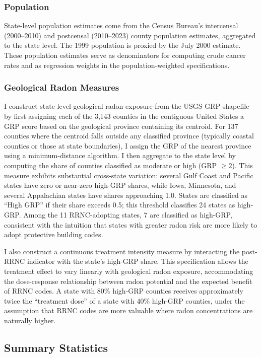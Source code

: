 \documentclass[12pt]{article}
\begin{document}
\subsubsection*{Population} State-level population estimates come from the Census Bureau's intercensal (2000--2010) and postcensal (2010--2023) county population estimates, aggregated to the state level. The 1999 population is proxied by the July 2000 estimate. These population estimates serve as denominators for computing crude cancer rates and as regression weights in the population-weighted specifications.

\subsubsection*{Geological Radon Measures} I construct state-level geological radon exposure from the USGS GRP shapefile by first assigning each of the 3,143 counties in the contiguous United States a GRP score based on the geological province containing its centroid. For 137 counties where the centroid falls outside any classified province (typically coastal counties or those at state boundaries), I assign the GRP of the nearest province using a minimum-distance algorithm. I then aggregate to the state level by computing the share of counties classified as moderate or high (GRP $\geq 2$). This measure exhibits substantial cross-state variation: several Gulf Coast and Pacific states have zero or near-zero high-GRP shares, while Iowa, Minnesota, and several Appalachian states have shares approaching 1.0. States are classified as ``High GRP'' if their share exceeds 0.5; this threshold classifies 24 states as high-GRP. Among the 11 RRNC-adopting states, 7 are classified as high-GRP, consistent with the intuition that states with greater radon risk are more likely to adopt protective building codes.

I also construct a continuous treatment intensity measure by interacting the post-RRNC indicator with the state's high-GRP share. This specification allows the treatment effect to vary linearly with geological radon exposure, accommodating the dose-response relationship between radon potential and the expected benefit of RRNC codes. A state with 80\% high-GRP counties receives approximately twice the ``treatment dose'' of a state with 40\% high-GRP counties, under the assumption that RRNC codes are more valuable where radon concentrations are naturally higher.

\subsection{Summary Statistics}
\end{document}
